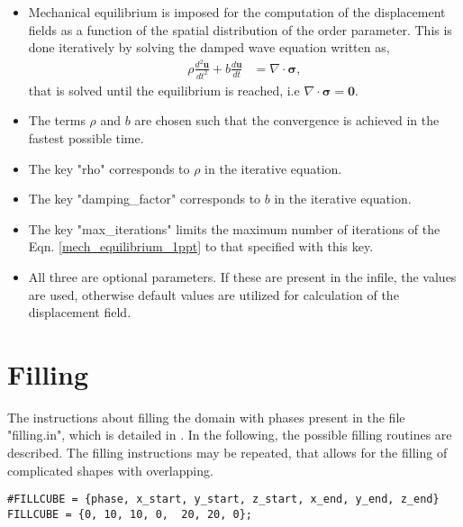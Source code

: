 \documentclass[a4paper,10pt]{article}
\begin{document}
\begin{itemize}
\item Mechanical equilibrium is imposed for the computation of the displacement 
fields as a function of the spatial distribution of the order parameter. 
This is done iteratively by solving the damped wave equation written 
as, 
\begin{align}
  \rho\frac{d^2\bm{u}}{dt^2} + b\frac{d\bm{u}}{dt} &= \nabla \cdot \bm{\sigma}, 
  \label{mech_equilibrium_1ppt}
\end{align}
that is solved until the equilibrium is reached, i.e $\nabla\cdot\bm{\sigma}=\bm{0}$.
\item The terms $\rho$ and $b$ are chosen such that the convergence is achieved in the fastest possible time. 
\item The key "rho" corresponds to $\rho$ in the iterative equation.
\item The key "damping\_factor" corresponds to $b$ in the iterative equation.
\item The key "max\_iterations" limits the maximum number of iterations of the Eqn. \ref{mech_equilibrium_1ppt} to that specified with this key.
\item All three are optional parameters. If these are present in the infile, the values are used, otherwise default values are utilized for calculation of the displacement field.
\end{itemize}


\section{Filling}

The instructions about filling the domain with phases present in the file "filling.in", which 
is detailed in . In the following, the possible filling routines 
are described. The filling instructions may be repeated, that allows for the filling of 
complicated shapes with overlapping. 

\begin{lstlisting}
#FILLCUBE = {phase, x_start, y_start, z_start, x_end, y_end, z_end}
FILLCUBE = {0, 10, 10, 0,  20, 20, 0};
\end{lstlisting}
\end{document}

